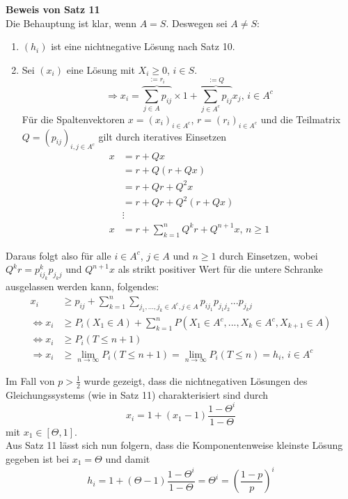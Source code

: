 \documentclass[a4paper,12pt]{article}
\begin{document}
\textbf{Beweis von Satz 11}\\
Die Behauptung ist klar, wenn $A = S$. Deswegen sei $A \neq S$:
\begin{enumerate}
	\item $(h_i)$ ist eine nichtnegative Lösung nach Satz 10.
	\item Sei $(x_i)$ eine Lösung mit $X_i \geq 0$, $i \in S$.
	      $$
		      \Rightarrow x_i = \overbrace{\sum_{j \in A}p_{ij} }^{:= r_i}\times 1 + \overbrace{\sum_{j \in A^c}p_{ij}}^{:= Q}x_j \text{, } i \in A^c
	      $$
	      Für die Spaltenvektoren $x = (x_i)_{i \in A^c}$, $r = (r_i)_{i \in A^c}$ und die Teilmatrix $Q = (p_{ij})_{i,j \in A^c}$ gilt
	      durch iteratives Einsetzen
	      \begin{align*}
		      x & = r + Qx                                               \\
		        & = r + Q(r + Qx)                                        \\
		        & = r + Qr + Q^2x                                        \\
		        & = r + Qr + Q^2(r + Qx)                                 \\
		        & \vdots                                                 \\
		      x & = r + \sum_{k=1}^{n}Q^kr + Q^{n+1}x \text{, } n \geq 1
	      \end{align*}
\end{enumerate}
Daraus folgt also für alle $i \in A^c$, $j \in A$ und $n \geq 1$ durch Einsetzen, wobei $Q^kr = p_{ij_k}^{k}p_{j_kj}$ und $Q^{n+1}x$ als
strikt positiver Wert für die untere Schranke ausgelassen werden kann, folgendes:
\begin{align*}
	x_i                 & \geq p_{ij} + \sum_{k=1}^{n}\sum_{j_1, ..., j_k \in A^c, j \in A}p_{ij_1}p_{j_1j_2}...p_{j_kj}       \\
	\Leftrightarrow x_i & \geq P_i(X_1 \in A) + \sum_{k=1}^{n}P(X_1 \in A^c, ..., X_k \in A^c, X_{k+1}\in A)                   \\
	\Leftrightarrow x_i & \geq P_i(T \leq n+1)                                                                                 \\
	\Rightarrow x_i     & \geq \lim_{n \to \infty}P_i(T \leq n+1) = \lim_{n \to \infty}P_i(T \leq n) = h_i \text{, } i \in A^c
\end{align*}


\begin{tcolorbox}[breakable, colframe=blue, colback=white, title=Beispiel 10 (Fortsetzung)]
	Im Fall von $p>\frac{1}{2}$ wurde gezeigt, dass die nichtnegativen Lösungen des Gleichungssystems (wie in Satz 11)
	charakterisiert sind durch
	$$
		x_i = 1 + (x_1 - 1)\frac{1- \Theta^i}{1- \Theta}
	$$
	mit $x_1 \in [\Theta,1]$.\\
	Aus Satz 11 lässt sich nun folgern, dass die Komponentenweise kleinste Lösung gegeben ist bei $x_1 = \Theta$ und damit
	$$
		h_i = 1+ (\Theta - 1)\frac{1- \Theta^i}{1- \Theta} = \Theta^i = \left(\frac{1-p}{p}\right)^i
	$$
\end{tcolorbox}
\end{document}
